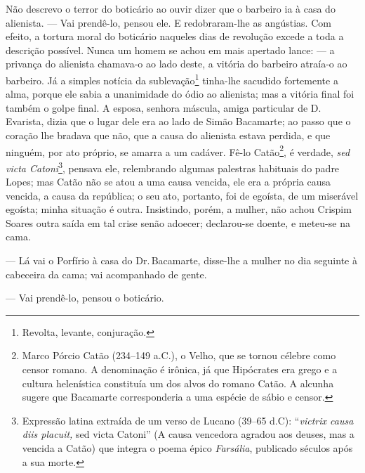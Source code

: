 Não descrevo o terror do boticário ao ouvir dizer que o barbeiro ia à
casa do alienista. --- Vai prendê-lo, pensou ele. E redobraram-lhe as
angústias. Com efeito, a tortura moral do boticário naqueles dias de
revolução excede a toda a descrição possível. Nunca um homem se achou em
mais apertado lance: --- a privança do alienista chamava-o ao lado
deste, a vitória do barbeiro atraía-o ao barbeiro. Já a simples notícia
da sublevação\footnote{Revolta, levante, conjuração.} tinha-lhe sacudido
fortemente a alma, porque ele sabia a unanimidade do ódio ao alienista;
mas a vitória final foi também o golpe final. A esposa, senhora máscula,
amiga particular de D.\,Evarista, dizia que o lugar dele era ao lado de
Simão Bacamarte; ao passo que o coração lhe bradava que não, que a causa
do alienista estava perdida, e que ninguém, por ato próprio, se amarra a
um cadáver. Fê-lo Catão\footnote{Marco Pórcio Catão (234--149 a.C.), o
  Velho, que se tornou célebre como censor romano. A denominação é
  irônica, já que Hipócrates era grego e a cultura helenística
  constituía um dos alvos do romano Catão. A alcunha sugere que
  Bacamarte corresponderia a uma espécie de sábio e censor.}, é verdade,
\emph{sed victa Catoni}\footnote{Expressão latina extraída de um verso
  de Lucano (39--65 d.C): ``\emph{victrix causa diis placuit,} sed victa
  Catoni'' (A causa vencedora agradou aos deuses, mas a vencida a Catão)
  que integra o poema épico \emph{Farsália}, publicado séculos após a
  sua morte.}, pensava ele, relembrando algumas palestras habituais do
padre Lopes; mas Catão não se atou a uma causa vencida, ele era a
própria causa vencida, a causa da república; o seu ato, portanto, foi de
egoísta, de um miserável egoísta; minha situação é outra. Insistindo,
porém, a mulher, não achou Crispim Soares outra saída em tal crise senão
adoecer; declarou-se doente, e meteu-se na cama.

--- Lá vai o Porfírio à casa do Dr.\,Bacamarte, disse-lhe a mulher no dia
seguinte à cabeceira da cama; vai acompanhado de gente.

--- Vai prendê-lo, pensou o boticário.


